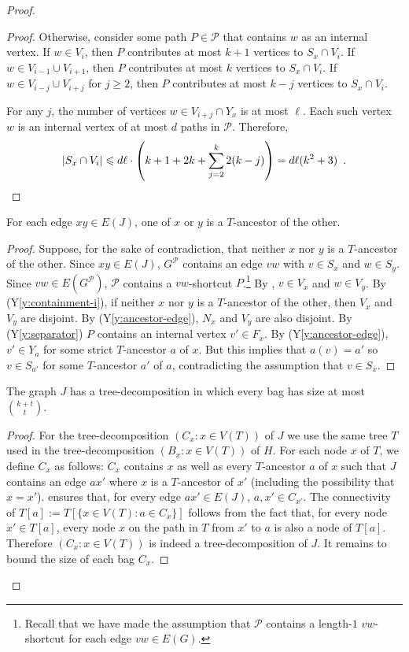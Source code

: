 \documentclass{patmorin}
\newcommand{\yref}[1]{(Y\ref{y:#1})}
\renewcommand{\ge}{\geqslant}
\renewcommand{\le}{\leqslant}
\begin{document}
\begin{proof}
\begin{proof}
  Otherwise, consider some path $P\in\mathcal{P}$ that contains $w$ as an internal vertex.  If $w\in V_{i}$, then $P$ contributes at most $k+1$ vertices to $S_x\cap V_i$.  If $w\in V_{i-1}\cup V_{i+1}$, then $P$ contributes at most $k$ vertices to $S_x\cap V_i$. If $w\in V_{i-j}\cup V_{i+j}$ for $j\ge 2$, then $P$ contributes at most $k-j$ vertices to $S_x\cap V_i$.
  
  For any $j$, the number of vertices $w\in V_{i+j}\cap Y_x$ is at most $\ell$. Each such vertex $w$ is an internal vertex of at most $d$ paths in $\mathcal{P}$. Therefore, 
  \[  |S_x\cap V_i|\le d\ell\cdot\left(k+1 + 2k + \sum_{j=2}^k 2(k-j)\right) %
      = d\ell(k^2 +3) \enspace . \qedhere
  \]
\end{proof}

\begin{clm}
  For each edge $xy\in E(J)$, one of $x$ or $y$ is a $T$-ancestor of the other.
\end{clm}

\begin{proof}
  Suppose, for the sake of contradiction, that neither $x$ nor $y$ is a $T$-ancestor of the other.  Since $xy\in E(J)$, $G^\mathcal{P}$ contains an edge $vw$ with $v\in S_x$ and $w\in S_y$.  Since $vw\in E(G^{\mathcal{P}})$,  $\mathcal{P}$ contains a $vw$-shortcut $P$.\footnote{Recall that we have made the assumption that $\mathcal{P}$ contains a length-$1$ $vw$-shortcut for each edge $vw\in E(G)$.}  By , $v\in V_x$ and $w\in V_y$.  By \yref{containment-i}, if neither $x$ nor $y$ is a $T$-ancestor of the other, then $V_x$ and $V_y$ are disjoint.  By \yref{ancestor-edge}, $N_x$ and $V_y$ are also disjoint.  By \yref{separator} $P$ contains an internal vertex $v'\in F_x$.  By \yref{ancestor-edge}, $v'\in Y_a$ for some strict $T$-ancestor $a$ of $x$.  But this implies that $a(v)=a'$ so $v\in S_{a'}$ for some $T$-ancestor $a'$ of $a$, contradicting the assumption that $v\in S_x$.
\end{proof}

\begin{clm}
  The graph $J$ has a tree-decomposition in which every bag has size at most $\binom{k+t}{t}$.
\end{clm}

\begin{proof}
  For the tree-decomposition $(C_x:x\in V(T))$ of $J$ we use the same tree $T$ used in the tree-decomposition $(B_x:x\in V(T))$ of $H$. For each node $x$ of $T$, we define $C_x$ as follows: $C_x$ contains $x$ as well as every $T$-ancestor $a$ of $x$ such that $J$ contains an edge $ax'$ where $x$ is a $T$-ancestor of $x'$ (including the possibility that $x=x'$).
   ensures that, for every edge $ax'\in E(J)$, $a,x'\in C_{x'}$.  The connectivity of $T[a]:=T[\{x\in V(T):a\in C_x\}]$ follows from the fact that, for every node $x'\in T[a]$, every node $x$ on the path in $T$ from $x'$ to  $a$ is also a node of $T[a]$.  Therefore $(C_x:x\in V(T))$ is indeed a tree-decomposition of $J$.  It remains to bound the size of each bag $C_x$. 
  

\end{proof}
\end{proof}
\end{document}
